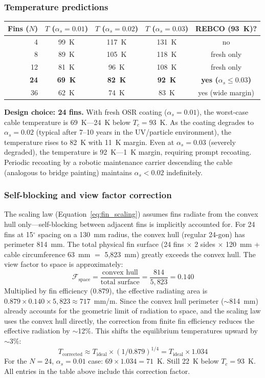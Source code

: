 \documentclass[12pt,letterpaper]{article}
\begin{document}
\subsubsection{Temperature predictions}

\begin{center}
\small
\begin{tabular}{rcccc}
\toprule
\textbf{Fins ($N$)} & \textbf{$T$ ($\alpha_s\!=\!0.01$)} & \textbf{$T$ ($\alpha_s\!=\!0.02$)} & \textbf{$T$ ($\alpha_s\!=\!0.03$)} & \textbf{REBCO (93~K)?} \\
\midrule
4 & 99~K & 117~K & 131~K & no \\
8 & 89~K & 105~K & 118~K & fresh only \\
12 & 81~K & 96~K & 108~K & fresh only \\
\textbf{24} & \textbf{69~K} & \textbf{82~K} & \textbf{92~K} & \textbf{yes ($\alpha_s \leq 0.03$)} \\
36 & 62~K & 74~K & 83~K & yes (wide margin) \\
\bottomrule
\end{tabular}
\end{center}

\textbf{Design choice: 24 fins.} With fresh OSR coating ($\alpha_s = 0.01$), the worst-case cable temperature is 69~K---24~K below $T_c = 93$~K. As the coating degrades to $\alpha_s = 0.02$ (typical after 7--10 years in the UV/particle environment), the temperature rises to 82~K with 11~K margin. Even at $\alpha_s = 0.03$ (severely degraded), the temperature is 92~K---1~K margin, requiring prompt recoating. Periodic recoating by a robotic maintenance carrier descending the cable (analogous to bridge painting) maintains $\alpha_s < 0.02$ indefinitely.

\subsubsection{Self-blocking and view factor correction}

The scaling law (Equation~\ref{eq:fin_scaling}) assumes fins radiate from the convex hull only---self-blocking between adjacent fins is implicitly accounted for. For 24 fins at 15$^\circ$ spacing on a 130~mm radius, the convex hull (regular 24-gon) has perimeter 814~mm. The total physical fin surface (24 fins $\times$ 2 sides $\times$ 120~mm + cable circumference 63~mm $=$ 5{,}823~mm) greatly exceeds the convex hull. The view factor to space is approximately:
\[
\mathcal{F}_{\text{space}} = \frac{\text{convex hull}}{\text{total surface}} = \frac{814}{5{,}823} = 0.140
\]
Multiplied by fin efficiency (0.879), the effective radiating area is $0.879 \times 0.140 \times 5{,}823 \approx 717$~mm/m. Since the convex hull perimeter (${\sim}$814~mm) already accounts for the geometric limit of radiation to space, and the scaling law uses the convex hull directly, the correction from finite fin efficiency reduces the effective radiation by ${\sim}$12\%. This shifts the equilibrium temperatures upward by ${\sim}$3\%:
\[
T_{\text{corrected}} \approx T_{\text{ideal}} \times (1/0.879)^{1/4} = T_{\text{ideal}} \times 1.034
\]
For the $N = 24$, $\alpha_s = 0.01$ case: $69 \times 1.034 = 71$~K. Still 22~K below $T_c = 93$~K. All entries in the table above include this correction factor.
\end{document}
